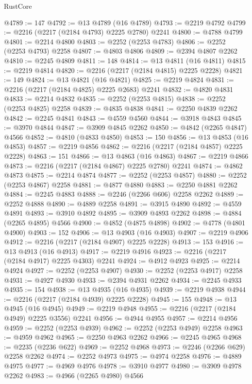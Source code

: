 \begin{lexlean}{RustCore}
\begin{coremodule}
@4789 := 147
@4792 := @13 @4789 (@16 @4789)
@4793 := @2219 @4792
@4799 := @2216 (@2217 (@2184 @4793) @2225 @2780) @2241
@4800 := @4788 @4799
@4801 := @2214 @4800
@4803 := @2252 (@2253 @4783)
@4806 := @2252 (@2253 @4793) @2258
@4807 := @4803 @4806
@4809 := @2394 @4807 @2262
@4810 := @2245 @4809
@4811 := 148
@4814 := @13 @4811 (@16 @4811)
@4815 := @2219 @4814
@4820 := @2216 (@2217 (@2184 @4815) @2225 @2228)
@4821 := 149
@4824 := @13 @4821 (@16 @4821)
@4825 := @2219 @4824
@4831 := @2216 (@2217 (@2184 @4825) @2225 @2683) @2241
@4832 := @4820 @4831
@4833 := @2214 @4832
@4835 := @2252 (@2253 @4815)
@4838 := @2252 (@2253 @4825) @2258
@4839 := @4835 @4838
@4841 := @2250 @4839 @2262
@4842 := @2245 @4841
@4843 := @4559 @4560
@4844 := @3918 @4843
@4845 := @3970 @4844
@4847 := @3909 @4845 @2262
@4850 := @4842 (@2265 @4847) @4566
@4852 := @4810 (@4833 @4850)
@4853 := 150
@4856 := @13 @4853 (@16 @4853)
@4857 := @2219 @4856
@4862 := @2216 (@2217 (@2184 @4857) @2225 @2228)
@4863 := 151
@4866 := @13 @4863 (@16 @4863)
@4867 := @2219 @4866
@4873 := @2216 (@2217 (@2184 @4867) @2225 @2780) @2241
@4874 := @4862 @4873
@4875 := @2214 @4874
@4877 := @2252 (@2253 @4857)
@4880 := @2252 (@2253 @4867) @2258
@4881 := @4877 @4880
@4883 := @2250 @4881 @2262
@4884 := @2245 @4883
@4888 := @2246 (@2266 @606) @2258 @2262
@4889 := @2252 @4888
@4890 := @4889 @2258
@4891 := @3915 @4890
@4892 := @4559 @4891
@4893 := @3910 @4892
@4895 := @3909 @4893 @2262
@4898 := @4884 (@2265 @4895) @4566
@4900 := @4852 (@4875 @4898)
@4902 := @4778 (@4801 @4900)
@4903 := 152
@4906 := @13 @4903 (@16 @4903)
@4907 := @2219 @4906
@4912 := @2216 (@2217 (@2184 @4907) @2225 @2228)
@4913 := 153
@4916 := @13 @4913 (@16 @4913)
@4917 := @2219 @4916
@4923 := @2216 (@2217 (@2184 @4917) @2225 @4303) @2241
@4924 := @4912 @4923
@4925 := @2214 @4924
@4927 := @2252 (@2253 @4907)
@4930 := @2252 (@2253 @4917) @2258
@4931 := @4927 @4930
@4933 := @2394 @4931 @2262
@4934 := @2245 @4933
@4935 := 154
@4938 := @13 @4935 (@16 @4935)
@4939 := @2219 @4938
@4944 := @2216 (@2217 (@2184 @4939) @2225 @2228)
@4945 := 155
@4948 := @13 @4945 (@16 @4945)
@4949 := @2219 @4948
@4955 := @2216 (@2217 (@2184 @4949) @2225 @3556) @2241
@4956 := @4944 @4955
@4957 := @2214 @4956
@4959 := @2252 (@2253 @4939)
@4962 := @2252 (@2253 @4949) @2258
@4963 := @4959 @4962
@4965 := @2250 @4963 @2262
@4966 := @2245 @4965
@4968 := @2235 (@2236 @622)
@4969 := @2252 @4968
@4973 := @2246 (@2266 @629) @2258 @2262
@4974 := @2252 @4973
@4975 := @4974 @2258
@4976 := @4889 @4975
@4977 := @4969 @4976
@4978 := @3910 @4977
@4980 := @3909 @4978 @2262
@4983 := @4966 (@2265 @4980) @4566

\end{coremodule}
\end{lexlean}
